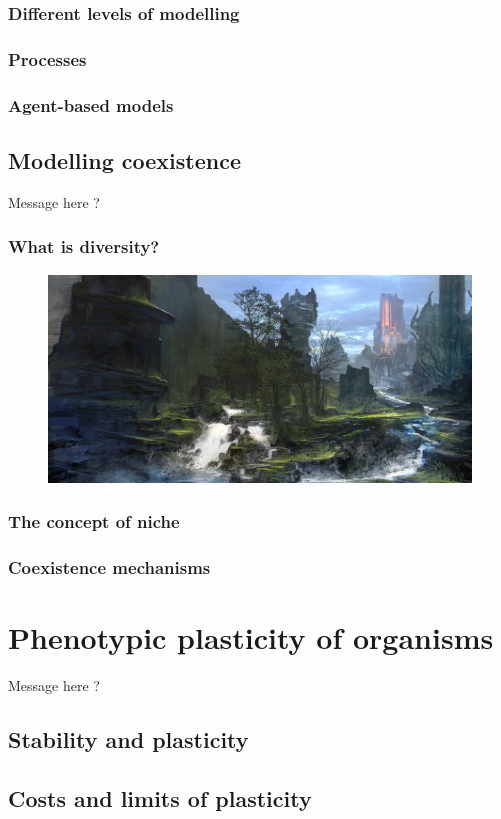 \subsection{Different levels of modelling}

\subsection{Processes}

\subsection{Agent-based models}


\section{Modelling coexistence}
Message here ?

\subsection{What is diversity?}
\begin{figure}
\includegraphics[scale=1]{./Introduction/graphics/plankton.jpg}
\end{figure}

\subsection{The concept of niche}


\subsection{Coexistence mechanisms}

\chapter{Phenotypic plasticity of organisms}
Message here ?

\section{Stability and plasticity}

\section{Costs and limits of plasticity}

